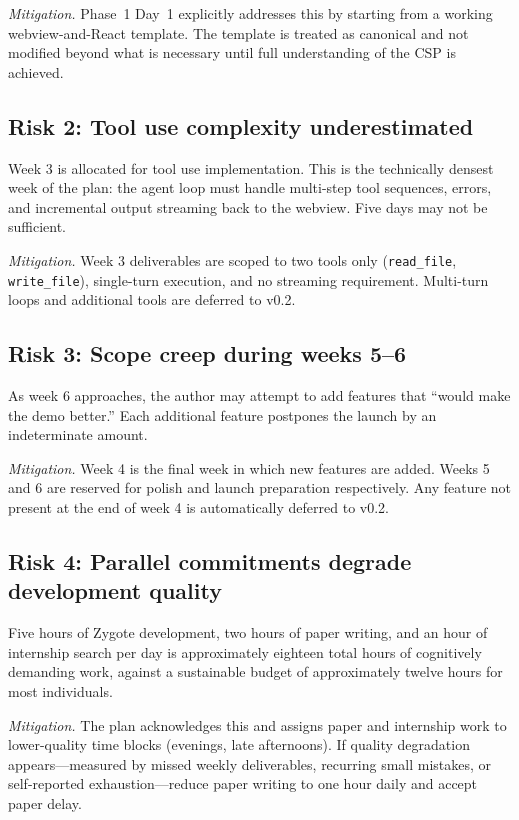 \documentclass[11pt,letterpaper]{article}
\begin{document}
\textit{Mitigation.} Phase~1 Day~1 explicitly addresses this by starting from a working webview-and-React template. The template is treated as canonical and not modified beyond what is necessary until full understanding of the CSP is achieved.

\subsection*{Risk 2: Tool use complexity underestimated}

Week 3 is allocated for tool use implementation. This is the technically densest week of the plan: the agent loop must handle multi-step tool sequences, errors, and incremental output streaming back to the webview. Five days may not be sufficient.

\textit{Mitigation.} Week 3 deliverables are scoped to two tools only (\texttt{read\_file}, \texttt{write\_file}), single-turn execution, and no streaming requirement. Multi-turn loops and additional tools are deferred to v0.2.

\subsection*{Risk 3: Scope creep during weeks 5--6}

As week 6 approaches, the author may attempt to add features that ``would make the demo better.'' Each additional feature postpones the launch by an indeterminate amount.

\textit{Mitigation.} Week 4 is the final week in which new features are added. Weeks 5 and 6 are reserved for polish and launch preparation respectively. Any feature not present at the end of week 4 is automatically deferred to v0.2.

\subsection*{Risk 4: Parallel commitments degrade development quality}

Five hours of Zygote development, two hours of paper writing, and an hour of internship search per day is approximately eighteen total hours of cognitively demanding work, against a sustainable budget of approximately twelve hours for most individuals.

\textit{Mitigation.} The plan acknowledges this and assigns paper and internship work to lower-quality time blocks (evenings, late afternoons). If quality degradation appears---measured by missed weekly deliverables, recurring small mistakes, or self-reported exhaustion---reduce paper writing to one hour daily and accept paper delay.
\end{document}
